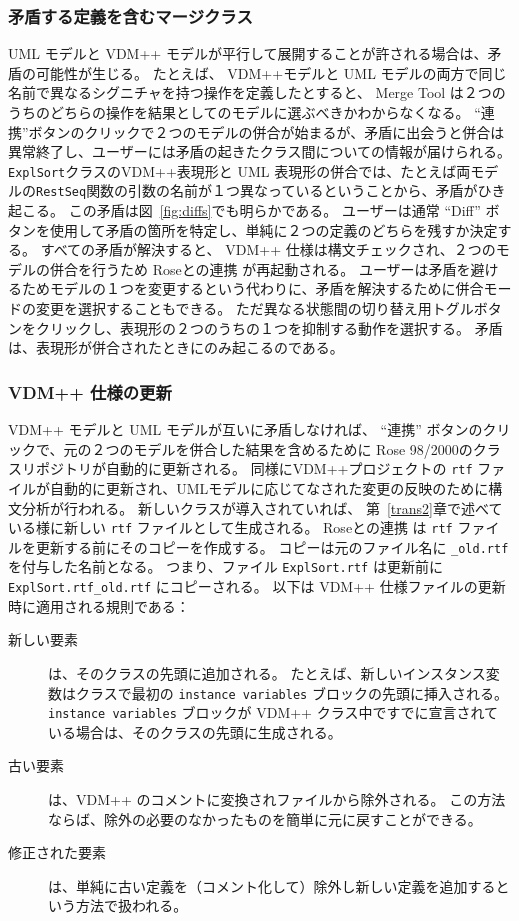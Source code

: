 \documentclass[\pformat,12pt]{jarticle}
\newcommand{\vdmpp}{VDM++}
\newcommand{\link}{Roseとの連携}
\newcommand{\rose}{Rose 98/2000}
\begin{document}
\subsubsection*{矛盾する定義を含むマージクラス}
\label{mergingclasses}
 
 UML モデルと \vdmpp{} モデルが平行して展開することが許される場合は、矛盾の可能性が生じる。
たとえば、 \vdmpp{}モデルと UML モデルの両方で同じ名前で異なるシグニチャを持つ操作を定義したとすると、 Merge Tool は２つのうちのどちらの操作を結果としてのモデルに選ぶべきかわからなくなる。
``連携''ボタンのクリックで２つのモデルの併合が始まるが、矛盾に出会うと併合は異常終了し、ユーザーには矛盾の起きたクラス間についての情報が届けられる。
 {\tt ExplSort}クラスの\vdmpp{}表現形と UML 表現形の併合では、たとえば両モデルの{\tt RestSeq}関数の引数の名前が１つ異なっているということから、矛盾がひき起こる。
この矛盾は図~\ref{fig:diffs}でも明らかである。
ユーザーは通常 ``Diff'' ボタンを使用して矛盾の箇所を特定し、単純に２つの定義のどちらを残すか決定する。
すべての矛盾が解決すると、 \vdmpp{} 仕様は構文チェックされ、２つのモデルの併合を行うため \link{} が再起動される。
ユーザーは矛盾を避けるためモデルの１つを変更するという代わりに、矛盾を解決するために併合モードの変更を選択することもできる。
ただ異なる状態間の切り替え用トグルボタンをクリックし、表現形の２つのうちの１つを抑制する動作を選択する。
矛盾は、表現形が併合されたときにのみ起こるのである。

\subsubsection*{ \vdmpp{} 仕様の更新}
\label{updating}
  
\vdmpp{} モデルと UML モデルが互いに矛盾しなければ、 ``連携'' ボタンのクリックで、元の２つのモデルを併合した結果を含めるために \rose{}のクラスリポジトリが自動的に更新される。
同様に\vdmpp{}プロジェクトの {\tt rtf} ファイルが自動的に更新され、UMLモデルに応じてなされた変更の反映のために構文分析が行われる。
新しいクラスが導入されていれば、 第~\ref{trans2}章で述べている様に新しい {\tt rtf} ファイルとして生成される。
 \link{} は {\tt rtf} ファイルを更新する前にそのコピーを作成する。
コピーは元のファイル名に {\tt \_old.rtf} を付与した名前となる。
つまり、ファイル {\tt ExplSort.rtf} は更新前に {\tt  ExplSort.rtf\_old.rtf} にコピーされる。
以下は \vdmpp{} 仕様ファイルの更新時に適用される規則である：


\begin{description}
\item[新しい要素] は、そのクラスの先頭に追加される。
たとえば、新しいインスタンス変数はクラスで最初の {\tt instance variables} ブロックの先頭に挿入される。
 {\tt instance variables} ブロックが \vdmpp{} クラス中ですでに宣言されている場合は、そのクラスの先頭に生成される。
\item[古い要素] は、\vdmpp{} のコメントに変換されファイルから除外される。
この方法ならば、除外の必要のなかったものを簡単に元に戻すことができる。
\item[修正された要素] は、単純に古い定義を（コメント化して）除外し新しい定義を追加するという方法で扱われる。
\end{description}
\end{document}
